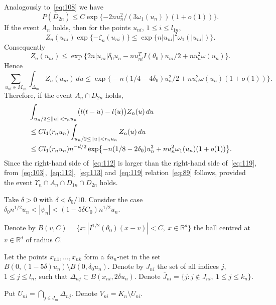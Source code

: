\documentclass[11pt,a4paper]{article}
\begin{document}
Analogously to~\eqref{eq:108} we have
\begin{equation}
P(\overline{D}_{2n})\le C\exp\{-2nu_n^2/(3\omega_1(u_n))(1+o(1))\}.
\label{eq:115}
\end{equation}
If the event $A_n$ holds, then for the points $u_{ni}$, $1\le i\le l_{1n}$,
\begin{equation}
Z_n(u_{ni})\exp\{-\zeta_n(u_{ni})\}\le\exp\{n|u_{ni}|^2\omega_1(|u_{ni}|)\}.
\label{eq:116}
\end{equation}
Consequently
\begin{equation}
Z_n(u_{ni})\le\exp\{2n|u_{ni}|\delta_0 u_n-nu_{ni}^TI(\theta_0)u_{ni}/2+nu_n^2\omega(u_n)\}.
\label{eq:117}
\end{equation}
Hence
\begin{equation}
\sum_{u_{ni}\in M_{2n}}\int_{\Delta_{ni}}Z_n(u_{ni})\,du\le\exp\bigl\{-n(1/4-4\delta_0)u_n^2/2+nu_n^2\omega(u_n)(1+o(1))\bigr\}.
\label{eq:118}
\end{equation}
Therefore, if the event $A_n\cap D_{2n}$ holds,
\begin{align}
&\int_{u_n/2\le\|u\|<r_nu_n}\bigl(l(t-u)-l(u)\bigr)Z_n(u)\,du\notag\\
&\le C l_1(r_nu_n)\int_{u_n/2\le\|u\|<r_nu_n}Z_n(u)\,du\notag\\
&\le C l_1(r_nu_n)n^{-d/2}\exp\bigl\{-n(1/8-2\delta_0)u_n^2+nu_n^2\omega_1(u_n)(1+o(1))\bigr\}.
\label{eq:119}
\end{align}
Since the right-hand side of~\eqref{eq:112} is larger than the right-hand side of~\eqref{eq:119}, from~\eqref{eq:103},~\eqref{eq:112},~\eqref{eq:113} and~\eqref{eq:119} relation~\eqref{eq:89} follows, provided the event $\Upsilon_n\cap A_n\cap D_{1n}\cap D_{2n}$ holds.

Take $\delta>0$ with $\delta<\delta_0/10$. Consider the case $\delta_0 n^{1/2}u_n<|\psi_n|<(1-5\delta C_0)n^{1/2}u_n$.

Denote by $B(v,C)=\{x:|I^{1/2}(\theta_0)(x-v)|<C,\ x\in\mathbb{R}^d\}$ the ball centred at $v\in\mathbb{R}^d$ of radius $C$.

Let the points $x_{n1},\dots,x_{nk}$ form a $\delta u_n$-net in the set $B(0,(1-5\delta)u_n)\setminus B(0,\delta_0 u_n)$. Denote by $J_{ni}$ the set of all indices $j$, $1\le j\le l_n$, such that $\Delta_{nj}\subset B(x_{ni},2\delta u_n)$. Denote $\overline{J}_{ni}=\{j:j\notin J_{ni},\ 1\le j\le k_n\}$.

Put $U_{ni}=\bigcap_{j\in J_{ni}}\Delta_{nj}$. Denote $V_{ni}=K_n\setminus U_{ni}$.
\end{document}

